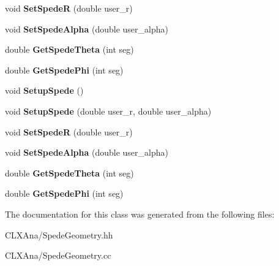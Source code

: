 \begin{DoxyCompactItemize}
void {\bfseries Set\+SpedeR} (double user\+\_\+r)
\item 
\mbox{\label{class_spede_geometry_a94c3f5b2dbf4490db7d72514c8abe340}} 
void {\bfseries Set\+Spede\+Alpha} (double user\+\_\+alpha)
\item 
\mbox{\label{class_spede_geometry_a05865b0752fb518337a9a16f8fba9085}} 
double {\bfseries Get\+Spede\+Theta} (int seg)
\item 
\mbox{\label{class_spede_geometry_a93bd92636bce1259b189bb17275d238d}} 
double {\bfseries Get\+Spede\+Phi} (int seg)
\item 
\mbox{\label{class_spede_geometry_aff2cf68512c9a78eb117ff1ea44e95f0}} 
void {\bfseries Setup\+Spede} ()
\item 
\mbox{\label{class_spede_geometry_ae79185d5c0e1d21a1a26ef824038ce9c}} 
void {\bfseries Setup\+Spede} (double user\+\_\+r, double user\+\_\+alpha)
\item 
\mbox{\label{class_spede_geometry_ad17f4485ee83860a40082d8c8af5237c}} 
void {\bfseries Set\+SpedeR} (double user\+\_\+r)
\item 
\mbox{\label{class_spede_geometry_a94c3f5b2dbf4490db7d72514c8abe340}} 
void {\bfseries Set\+Spede\+Alpha} (double user\+\_\+alpha)
\item 
\mbox{\label{class_spede_geometry_a05865b0752fb518337a9a16f8fba9085}} 
double {\bfseries Get\+Spede\+Theta} (int seg)
\item 
\mbox{\label{class_spede_geometry_a93bd92636bce1259b189bb17275d238d}} 
double {\bfseries Get\+Spede\+Phi} (int seg)
\end{DoxyCompactItemize}


The documentation for this class was generated from the following files\+:\begin{DoxyCompactItemize}
\item 
C\+L\+X\+Ana/Spede\+Geometry.\+hh\item 
C\+L\+X\+Ana/Spede\+Geometry.\+cc\end{DoxyCompactItemize}
